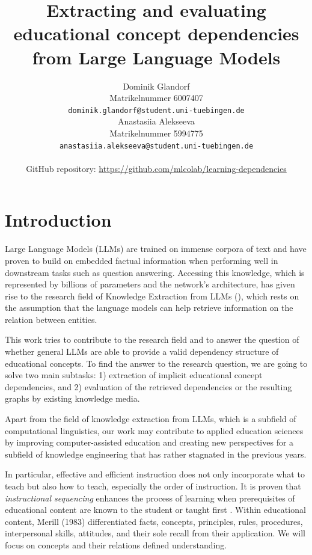 \documentclass{article}
\title{Extracting and evaluating educational concept dependencies from Large Language Models}
\author{%
  Dominik Glandorf\\
  Matrikelnummer 6007407\\
  \texttt{dominik.glandorf@student.uni-tuebingen.de} \\
  \And
  Anastasiia Alekseeva\\
  Matrikelnummer 5994775\\
  \texttt{anastasiia.alekseeva@student.uni-tuebingen.de} \\
  \\
  GitHub repository: \url{https://github.com/mlcolab/learning-dependencies}
}
\begin{document}
\vspace*{-5mm}
\maketitle
\vspace*{-5mm}

\begin{abstract}





\end{abstract}

\section{Introduction}
Large Language Models (LLMs) are trained on immense corpora of text and have proven to build on embedded factual information when performing well in downstream tasks such as question answering. Accessing this knowledge, which is represented by billions of parameters and the network's architecture, has given rise to the research field of Knowledge Extraction from LLMs (\cite{cohen2023crawling}), which rests on the assumption that the language models can help retrieve information on the relation between entities. 

This work tries to contribute to the research field and to answer the question of whether general LLMs are able to provide a valid dependency structure of educational concepts. To find the answer to the research question, we are going to solve two main subtasks: 1) extraction of implicit educational concept dependencies, and 2) evaluation of the retrieved dependencies or the resulting graphs by existing knowledge media.

Apart from the field of knowledge extraction from LLMs, which is a subfield of computational linguistics, our work may contribute to applied education sciences by improving computer-assisted education and creating new perspectives for a subfield of knowledge engineering that has rather stagnated in the previous years.

In particular, effective and efficient instruction does not only incorporate what to teach but also how to teach, especially the order of instruction.  It is proven that \textit{instructional sequencing} enhances the process of learning when prerequisites of educational content are known to the student or taught first \citep{morrison2019designing}.
Within educational content, Merill (1983) differentiated facts, concepts, principles, rules, procedures, interpersonal skills, attitudes, and their sole recall from their application. We will focus on concepts and their relations defined understanding. 
\end{document}
